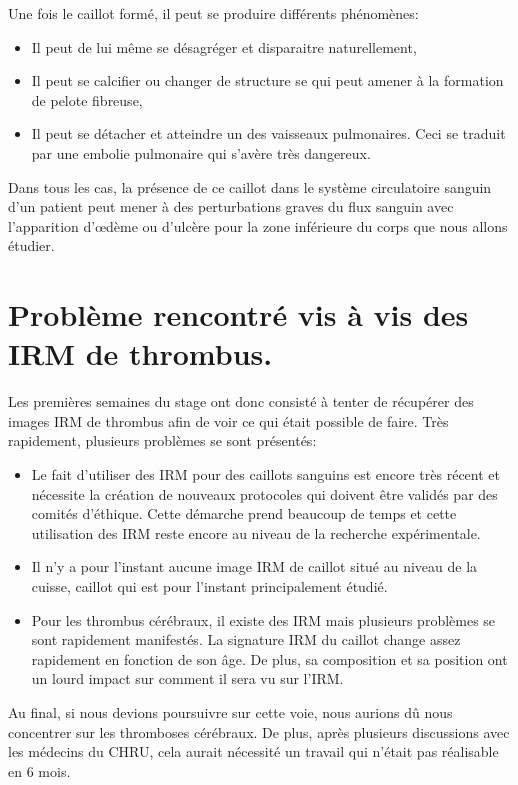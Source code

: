 Une fois le caillot formé, il peut se produire différents phénomènes:

\begin{itemize}
\item Il peut de lui même se désagréger et disparaitre naturellement,
\item Il peut se calcifier ou changer de structure se qui peut amener à la formation de pelote fibreuse,
\item Il peut se détacher et atteindre un des vaisseaux pulmonaires. Ceci se traduit par une embolie pulmonaire qui s'avère très dangereux.
\end{itemize}

Dans tous les cas, la présence de ce caillot dans le système circulatoire sanguin d'un patient peut mener à des perturbations graves du flux sanguin avec l'apparition d'œdème ou d'ulcère pour la zone inférieure du corps que nous allons étudier.

\section{Problème rencontré vis à vis des IRM de thrombus.}

Les premières semaines du stage ont donc consisté à tenter de récupérer des images IRM de thrombus afin de voir ce qui était possible de faire. Très rapidement, plusieurs problèmes se sont présentés:

\begin{itemize}
\item Le fait d'utiliser des IRM pour des caillots sanguins est encore très récent et nécessite la création de nouveaux protocoles qui doivent être validés par des comités d'éthique. Cette démarche prend beaucoup de temps et cette utilisation des IRM reste encore au niveau de la recherche expérimentale.
\item Il n'y a pour l'instant aucune image IRM de caillot situé au niveau de la cuisse, caillot qui est pour l'instant principalement étudié.
\item Pour les thrombus cérébraux, il existe des IRM mais plusieurs problèmes se sont rapidement manifestés. La signature IRM du caillot change assez rapidement en fonction de son âge. De plus, sa composition et sa position ont un lourd impact sur comment il sera vu sur l'IRM.
\end{itemize}

Au final, si nous devions poursuivre sur cette voie, nous aurions dû nous concentrer sur les thromboses cérébraux. De plus, après plusieurs discussions avec les médecins du CHRU, cela aurait nécessité un travail qui n'était pas réalisable en 6 mois.

